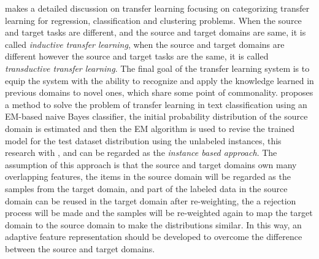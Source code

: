 \cite{pan2010survey} makes a detailed discussion on transfer learning focusing on categorizing transfer learning for regression, classification and clustering problems. When the source and target tasks are different, and the source and target domains are same, it is called \textit{inductive transfer learning}, when the source and target domains are different however the source and target tasks are the same, it is called \textit{transductive transfer learning}. The final goal of the transfer learning system is to equip the system with the ability to recognize and apply the knowledge learned in previous domains to novel ones, which share some point of commonality. \cite{dai2007transferring} proposes a method to solve the problem of transfer learning in text classification using an EM-based naive Bayes classifier, the initial probability distribution of the source domain is estimated and then the EM algorithm is used to revise the trained model for the test dataset distribution using the unlabeled instances, this research with \cite{jiang2007instance}, \cite{huang2006correcting} and \cite{bickel2007discriminative} can be regarded as the \textit{instance based approach}. The assumption of this approach is that the source and target domains own many overlapping features, the items in the source domain will be regarded as the samples from the target domain, and part of the labeled data in the source domain can be reused in the target domain after re-weighting, the a rejection process will be made and the samples will be re-weighted again to map the target domain to the source domain to make the distributions similar. In this way, an adaptive feature representation should be developed to overcome the difference between the source and target domains. 

